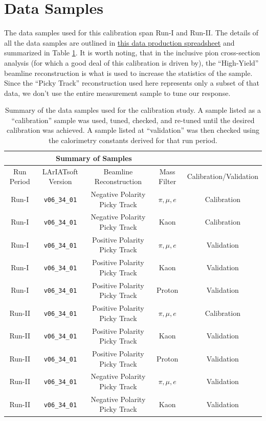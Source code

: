 \section{Data Samples}\label{sec:DataSamples}
The data samples used for this calibration span Run-I and Run-II. The details of all the data samples are outlined in \href{https://docs.google.com/spreadsheets/d/1_0kNCKBIIx53f6vopqN2OijtcTICHD9rDvN_YKGH2mI/edit?usp=sharing}{this data production spreadsheet} and summarized in Table \ref{tab:samples}. It is worth noting, that in the inclusive pion cross-section analysis (for which a good deal of this calibration is driven by), the ``High-Yield'' beamline reconstruction is what is used to increase the statistics of the sample. Since the ``Picky Track'' reconstruction used here represents only a subset of that data, we don't use the entire measurement sample to tune our response. 

\begin{center}
\begin{table}[htb]
	\begin{center}
	\begin{tabular}{c|c|c|c|c}
	\multicolumn{4}{c}{\textbf{Summary of Samples}} \\
	\hline \hline
	 Run Period & LArIATsoft Version & Beamline Reconstruction & Mass Filter & Calibration/Validation\\
	\hline
	Run-I & \verb!v06_34_01! & Negative Polarity Picky Track & $\pi, \mu, e$ & Calibration \\
	\hline
	Run-I & \verb!v06_34_01! & Negative Polarity Picky Track & Kaon & Calibration \\
	\hline
	Run-I & \verb!v06_34_01! & Positive Polarity Picky Track & $\pi, \mu, e$ & Validation \\
	\hline
	Run-I & \verb!v06_34_01! & Positive Polarity Picky Track & Kaon & Validation \\
	\hline
	Run-I & \verb!v06_34_01! & Positive Polarity Picky Track & Proton & Validation \\
	\hline
	\hline
	Run-II & \verb!v06_34_01! & Positive Polarity Picky Track & $\pi, \mu, e$ & Calibration \\
	\hline
	Run-II & \verb!v06_34_01! & Positive Polarity Picky Track & Kaon & Validation \\
	\hline
	Run-II & \verb!v06_34_01! & Positive Polarity Picky Track & Proton & Validation \\
	\hline
	Run-II & \verb!v06_34_01! & Negative Polarity Picky Track & $\pi, \mu, e$ & Validation \\
	\hline
	Run-II & \verb!v06_34_01! & Negative Polarity Picky Track & Kaon & Validation \\
	\hline
	\end{tabular}%
	\caption{Summary of the data samples used for the calibration study. A sample listed as a ``calibration'' sample was used, tuned, checked, and re-tuned until the desired calibration was achieved. A sample listed at ``validation'' was then checked using the calorimetry constants derived for that run period. }
	\label{tab:samples}
	\end{center}
\end{table}
\end{center}

